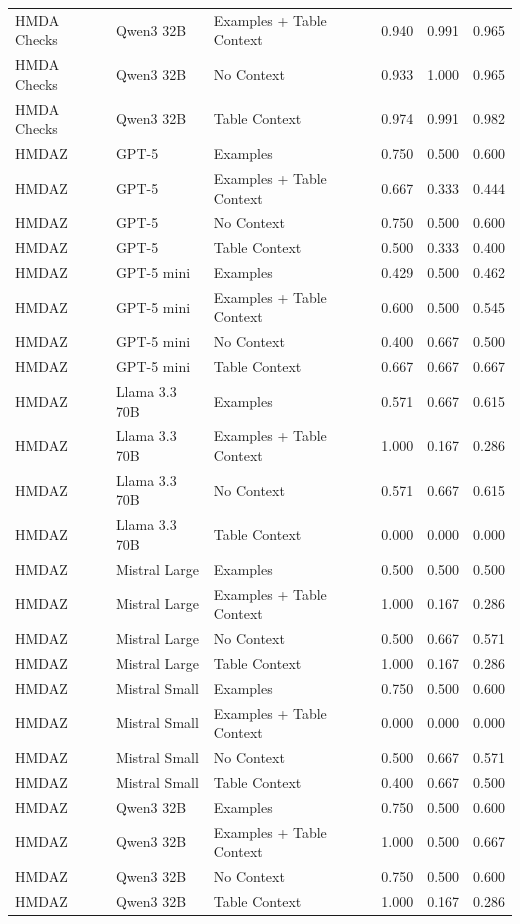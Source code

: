\begin{table}
\begin{tabular}{lllrrr}
HMDA Checks & Qwen3 32B & Examples + Table Context & 0.940 & 0.991 & 0.965 \\
HMDA Checks & Qwen3 32B & No Context & 0.933 & 1.000 & 0.965 \\
HMDA Checks & Qwen3 32B & Table Context & 0.974 & 0.991 & 0.982 \\
HMDAZ & GPT-5 & Examples & 0.750 & 0.500 & 0.600 \\
HMDAZ & GPT-5 & Examples + Table Context & 0.667 & 0.333 & 0.444 \\
HMDAZ & GPT-5 & No Context & 0.750 & 0.500 & 0.600 \\
HMDAZ & GPT-5 & Table Context & 0.500 & 0.333 & 0.400 \\
HMDAZ & GPT-5 mini & Examples & 0.429 & 0.500 & 0.462 \\
HMDAZ & GPT-5 mini & Examples + Table Context & 0.600 & 0.500 & 0.545 \\
HMDAZ & GPT-5 mini & No Context & 0.400 & 0.667 & 0.500 \\
HMDAZ & GPT-5 mini & Table Context & 0.667 & 0.667 & 0.667 \\
HMDAZ & Llama 3.3 70B & Examples & 0.571 & 0.667 & 0.615 \\
HMDAZ & Llama 3.3 70B & Examples + Table Context & 1.000 & 0.167 & 0.286 \\
HMDAZ & Llama 3.3 70B & No Context & 0.571 & 0.667 & 0.615 \\
HMDAZ & Llama 3.3 70B & Table Context & 0.000 & 0.000 & 0.000 \\
HMDAZ & Mistral Large & Examples & 0.500 & 0.500 & 0.500 \\
HMDAZ & Mistral Large & Examples + Table Context & 1.000 & 0.167 & 0.286 \\
HMDAZ & Mistral Large & No Context & 0.500 & 0.667 & 0.571 \\
HMDAZ & Mistral Large & Table Context & 1.000 & 0.167 & 0.286 \\
HMDAZ & Mistral Small & Examples & 0.750 & 0.500 & 0.600 \\
HMDAZ & Mistral Small & Examples + Table Context & 0.000 & 0.000 & 0.000 \\
HMDAZ & Mistral Small & No Context & 0.500 & 0.667 & 0.571 \\
HMDAZ & Mistral Small & Table Context & 0.400 & 0.667 & 0.500 \\
HMDAZ & Qwen3 32B & Examples & 0.750 & 0.500 & 0.600 \\
HMDAZ & Qwen3 32B & Examples + Table Context & 1.000 & 0.500 & 0.667 \\
HMDAZ & Qwen3 32B & No Context & 0.750 & 0.500 & 0.600 \\
HMDAZ & Qwen3 32B & Table Context & 1.000 & 0.167 & 0.286 \\
\bottomrule
\end{tabular}
\end{table}
